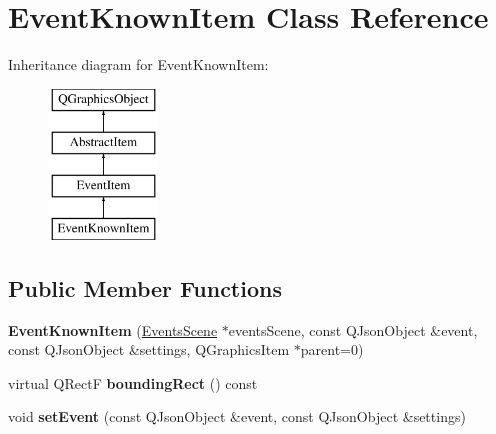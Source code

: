 \hypertarget{class_event_known_item}{\section{Event\-Known\-Item Class Reference}
\label{class_event_known_item}
}
Inheritance diagram for Event\-Known\-Item\-:\begin{figure}[H]
\begin{center}
\leavevmode
\includegraphics[height=4.000000cm]{class_event_known_item}
\end{center}
\end{figure}
\subsection*{Public Member Functions}
\begin{DoxyCompactItemize}
\item 
\hypertarget{class_event_known_item_a6a9e7b82b71ed5a2515b853316cb2b98}{{\bfseries Event\-Known\-Item} (\hyperlink{class_events_scene}{Events\-Scene} $\ast$events\-Scene, const Q\-Json\-Object \&event, const Q\-Json\-Object \&settings, Q\-Graphics\-Item $\ast$parent=0)}\label{class_event_known_item_a6a9e7b82b71ed5a2515b853316cb2b98}

\item 
\hypertarget{class_event_known_item_a1d8ce783f8c480ef6e5e86995bc21cb1}{virtual Q\-Rect\-F {\bfseries bounding\-Rect} () const }\label{class_event_known_item_a1d8ce783f8c480ef6e5e86995bc21cb1}

\item 
\hypertarget{class_event_known_item_ae6e5a2c93e9202ce5d5ef2ff6df161b4}{void {\bfseries set\-Event} (const Q\-Json\-Object \&event, const Q\-Json\-Object \&settings)}\label{class_event_known_item_ae6e5a2c93e9202ce5d5ef2ff6df161b4}

\end{DoxyCompactItemize}
